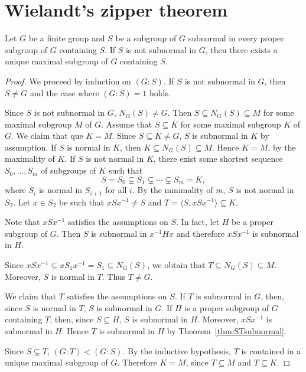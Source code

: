 \section{Wielandt's zipper theorem}

\begin{theorem}[Wielandt]
	\label{thm:zipper}
	Let $G$ be a finite group and $S$ be a subgroup of $G$ subnormal in every 
    proper subgroup of $G$ containing $S$. If $S$ is not subnormal in $G$, 
    then there exists a unique maximal subgroup of $G$ containing $S$. 
\end{theorem}

\begin{proof}
	We proceed by induction on $(G:S)$. If $S$ is not subnormal in $G$, then 
	$S\ne G$ and the case where $(G:S)=1$ holds. 

	Since $S$ is not subnormal in $G$, $N_G(S)\ne G$. Then $S\subseteq
	N_G(S)\subseteq M$ for some maximal subgroup $M$ of $G$. Assume that 
	$S\subseteq K$ for some maximal subgroup $K$ of $G$. We claim that 
	que $K=M$. Since $S\subseteq K\ne G$, $S$ is subnormal in $K$ by assumption. If $S$ is 
	normal in $K$, then $K\subseteq N_G(S)\subseteq M$. Hence $K=M$, by the maximality of $K$. 
	If $S$ is not normal in $K$, there exist some shortest sequence 
	$S_0,\dots,S_m$ of subgroups of $K$ such that 
	\[
		S=S_0\subsetneq S_1\subsetneq\cdots\subsetneq S_m=K,
	\]
    where $S_i$ is normal in $S_{i+1}$ for all $i$. By the minimality of $m$,  
	$S$ is not normal in $S_2$. Let $x\in S_2$ be such that $xSx^{-1}\ne S$ and 
	$T=\langle S,xSx^{-1}\rangle\subseteq K$. 

    Note that $xSx^{-1}$ satisfies the assumptions on $S$. In fact, let $H$ be a proper subgroup of $G$. 
    Then $S$ is subnormal in $x^{-1}Hx$ and therefore 
    $xSx^{-1}$ is subnormal in $H$. 
    
	Since $xSx^{-1}\subseteq xS_1x^{-1}=S_1\subseteq N_G(S)$, we obtain that 
	$T\subseteq N_G(S)\subseteq M$. Moreover, $S$ is normal in $T$. Thus $T\ne G$. 

	We claim that $T$ satisfies the assumptions on $S$. If $T$ is subnormal in $G$, then, since 
	$S$ is normal in $T$, $S$ is subnormal in $G$. If $H$ is a proper subgroup of $G$ 
    containing $T$, then, since 
	$S\subseteq H$, $S$ is subnormal in $H$. Moreover, $xSx^{-1}$ is subnormal in $H$. Hence 
	$T$ is subnormal in $H$ by Theorem~\ref{thm:STsubnormal}.

	Since $S\subsetneq T$, $(G:T)<(G:S)$. By the inductive hypothesis, $T$ is contained in a unique maximal subgroup of $G$. Therefore
	$K=M$, since $T\subseteq M$ and 
	$T\subseteq K$.
\end{proof}

